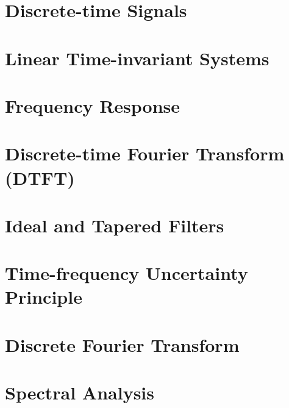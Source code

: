 \documentclass{tufte-book}
\begin{document}
\ifSpDT
\chapter{Discrete-time Signals}


 \ifSpExerciseSol
 
 \fi
\fi

\ifSpLTI
\chapter{Linear Time-invariant Systems}




 \ifSpExerciseSol
 
 \fi
\fi

\ifSpFResp
\chapter{Frequency Response}


 \ifSpExerciseSol
 
 \fi
\fi

\ifSpProgB

\fi

\ifSpDTFT
\chapter{Discrete-time Fourier Transform (DTFT)}


 \ifSpExerciseSol
 
 \fi
\fi

\ifSpFilters
\chapter{Ideal and Tapered Filters}


 \ifSpExerciseSol
 
 \fi
\fi

\ifSpUncertainty
\chapter{Time-frequency Uncertainty Principle}


 \ifSpExerciseSol
 
 \fi
\fi

\ifSpDFT
\chapter{Discrete Fourier Transform}


 \ifSpExerciseSol
 
 \fi
\fi

\ifSpSpectAn
\chapter{Spectral Analysis}


 \ifSpExerciseSol
 
 \fi
\fi
\end{document}
